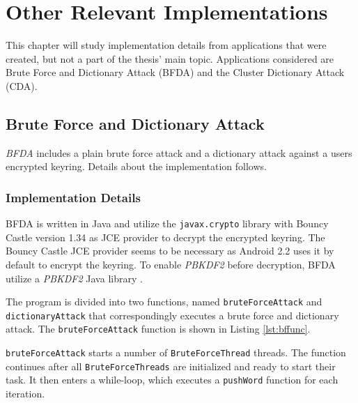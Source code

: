 \documentclass[pdftex,english,10pt,b5paper,twoside]{book}
\begin{document}
\appendix
\appendixpage
\addappheadtotoc
\chapter{Other Relevant Implementations}
\label{ap:other}

This chapter will study implementation details from applications that were
created, but not a part of the thesis' main topic. Applications considered are
Brute Force and Dictionary Attack (BFDA) and the Cluster Dictionary Attack (CDA).

\section{Brute Force and Dictionary Attack}

\emph{\ac{BFDA}} includes a plain brute force attack and a dictionary attack against
a users encrypted keyring. Details about the implementation follows.

\subsection{Implementation Details}

\ac{BFDA} is written in Java and utilize the \texttt{javax.crypto} library with Bouncy
Castle version 1.34 as JCE provider to decrypt the encrypted keyring. The
Bouncy Castle JCE provider seems to be necessary as Android 2.2 uses it by
default to encrypt the keyring. To enable \emph{PBKDF2} before decryption, \ac{BFDA}
utilize a \emph{PBKDF2} Java library \cite{pbkdf2}.

The program is divided into two functions, named \texttt{bruteForceAttack} and
\texttt{dictionaryAttack} that correspondingly executes a brute force and
dictionary attack. The \texttt{bruteForceAttack} function is shown in Listing
\ref{lst:bffunc}.



\texttt{bruteForceAttack} starts a number of \texttt{BruteForceThread} threads.
The function continues after all \texttt{BruteForceThreads} are initialized and
ready to start their task. It then enters a while-loop, which executes a
\texttt{pushWord} function for each iteration.
\end{document}
